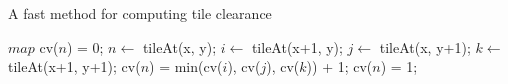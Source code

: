 \begin{algorithm}
  \caption{A fast method for computing tile clearance}
  \label{alg-clearance}
  \begin{algorithmic}[1]
	\REQUIRE $map$
			\STATE	cv($n$) = 0;
				\STATE $n \leftarrow$ tileAt(x, y);
				\STATE $i \leftarrow$ tileAt(x+1, y);
				\STATE $j \leftarrow$ tileAt(x, y+1);
				\STATE $k \leftarrow$ tileAt(x+1, y+1);
					\STATE cv($n$) = min(cv($i$), cv($j$), cv($k$)) + 1;
				\ELSE
					\STATE cv($n$) = 1;
				\ENDIF
			\ENDIF
		\ENDFOR
	\ENDFOR
  \end{algorithmic}
\end{algorithm}
